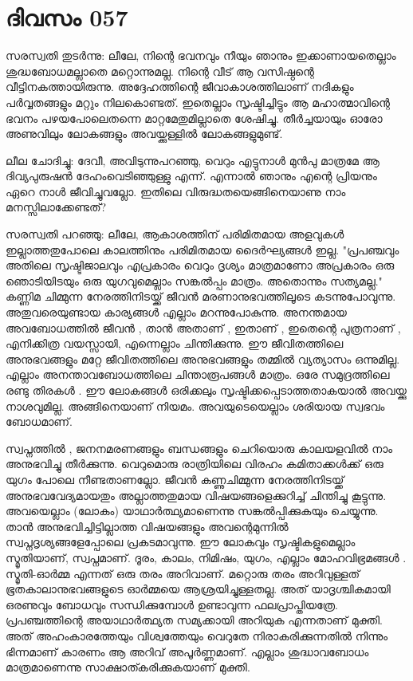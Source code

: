  
\section{ദിവസം 057}


സരസ്വതി തുടര്‍ന്നു: ലീലേ, നിന്റെ ഭവനവും നീയും ഞാനും ഇക്കാണായതെല്ലാം ശുദ്ധബോധമല്ലാതെ മറ്റൊന്നുമല്ല.  നിന്റെ വീട്‌ ആ വസിഷ്ഠന്റെ വീട്ടിനകത്തായിരുന്നു. അദ്ദേഹത്തിന്റെ ജീവാകാശത്തിലാണ്‌ നദികളും പര്‍വ്വതങ്ങളും മറ്റും നിലകൊണ്ടത്‌. ഇതെല്ലാം സൃഷ്ടിച്ചിട്ടും ആ മഹാത്മാവിന്റെ ഭവനം പഴയപോലെതന്നെ മാറ്റമേതുമില്ലാതെ ശേഷിച്ചു. തീര്‍ച്ചയായും ഓരോ അണുവിലും ലോകങ്ങളും അവയ്ക്കുള്ളില്‍ ലോകങ്ങളുമുണ്ട്‌.

ലീല ചോദിച്ചു: ദേവീ, അവിടുന്നുപറഞ്ഞു, വെറും എട്ടുനാള്‍ മുന്‍പു മാത്രമേ ആ ദിവ്യപുരുഷന്‍ ദേഹംവെടിഞ്ഞുള്ളു എന്ന്. എന്നാല്‍ ഞാനും എന്റെ പ്രിയനും ഏറെ നാള്‍ ജീവിച്ചുവല്ലോ. ഇതിലെ വിരുദ്ധതയെങ്ങിനെയാണു നാം മനസ്സിലാക്കേണ്ടത്‌?

സരസ്വതി പറഞ്ഞു: ലീലേ, ആകാശത്തിന്‌ പരിമിതമായ അളവുകള്‍ ഇല്ലാത്തതുപോലെ കാലത്തിനും പരിമിതമായ ദൈര്‍ഘ്യങ്ങള്‍ ഇല്ല. "പ്രപഞ്ചവും അതിലെ സൃഷ്ടിജാലവും എപ്രകാരം വെറും ദൃശ്യം മാത്രമാണോ അപ്രകാരം ഒരു ഞൊടിയിടയും ഒരു യുഗവുമെല്ലാം സങ്കല്‍പ്പം മാത്രം. അതൊന്നും സത്യമല്ല." കണ്ണിമ ചിമ്മുന്ന നേരത്തിനിടയ്ക്ക്‌ ജീവന്‍ മരണാനുഭവത്തിലൂടെ കടന്നുപോവുന്നു. അതുവരെയുണ്ടായ കാര്യങ്ങള്‍ എല്ലാം മറന്നുപോകുന്നു. അനന്തമായ അവബോധത്തില്‍ ജീവന്‍ , താന്‍ അതാണ്‌ , ഇതാണ്‌ , ഇതെന്റെ പുത്രനാണ്‌ , എനിക്കിത്ര വയസ്സായി, എന്നെല്ലാം ചിന്തിക്കുന്നു. ഈ ജീവിതത്തിലെ അനുഭവങ്ങളും മറ്റേ ജീവിതത്തിലെ അനുഭവങ്ങളും തമ്മില്‍ വ്യത്യാസം ഒന്നുമില്ല. എല്ലാം അനന്താവബോധത്തിലെ ചിന്താരൂപങ്ങള്‍ മാത്രം. ഒരേ സമുദ്രത്തിലെ രണ്ടു തിരകള്‍ . ഈ ലോകങ്ങള്‍ ഒരിക്കലും സൃഷ്ടിക്കപ്പെടാത്തതാകയാല്‍ അവയ്ക്കു നാശവുമില്ല. അങ്ങിനെയാണ്‌ നിയമം. അവയുടെയെല്ലാം ശരിയായ സ്വഭവം ബോധമാണ്‌.

സ്വപ്നത്തില്‍ ,  ജനനമരണങ്ങളും ബന്ധങ്ങളും ചെറിയൊരു കാലയളവില്‍ നാം അനുഭവിച്ചു തീര്‍ക്കുന്നു. വെറുമൊരു രാത്രിയിലെ വിരഹം കമിതാക്കള്‍ക്ക്‌ ഒരു യുഗം പോലെ നീണ്ടതാണല്ലോ. ജീവന്‍ കണ്ണുചിമ്മുന്ന നേരത്തിനിടയ്ക്ക്‌ അനുഭവവേദ്യമായതും അല്ലാത്തതുമായ വിഷയങ്ങളെക്കുറിച്ച്‌ ചിന്തിച്ചു കൂട്ടുന്നു. അവയെല്ലാം (ലോകം) യാഥാര്‍ത്ഥ്യമാണെന്നു സങ്കല്‍പ്പിക്കുകയും ചെയ്യുന്നു. താന്‍ അനുഭവിച്ചിട്ടില്ലാത്ത വിഷയങ്ങളും അവന്റെമുന്നില്‍ സ്വപ്നദൃശ്യങ്ങളേപ്പോലെ പ്രകടമാവുന്നു. ഈ ലോകവും സൃഷ്ടികളുമെല്ലാം സ്മൃതിയാണ്‌, സ്വപ്നമാണ്‌. ദൂരം, കാലം, നിമിഷം, യുഗം, എല്ലാം മോഹവിഭ്രമങ്ങള്‍ . സ്മൃതി-ഓര്‍മ്മ എന്നത്‌ ഒരു തരം അറിവാണ്‌. മറ്റൊരു തരം അറിവുള്ളത്‌ ഭൂതകാലാനുഭവങ്ങളുടെ ഓര്‍മ്മയെ ആശ്രയിച്ചുള്ളതല്ല. അത്‌ യാദൃശ്ചികമായി ഒരണുവും ബോധവും സന്ധിക്കുമ്പോള്‍ ഉണ്ടാവുന്ന ഫലപ്രാപ്തിയത്രേ. പ്രപഞ്ചത്തിന്റെ അയാഥാര്‍ത്ഥ്യത സമ്യക്കായി അറിയുക എന്നതാണ്‌ മുക്തി. അത്‌ അഹംകാരത്തേയും വിശ്വത്തേയും വെറുതേ നിരാകരിക്കുന്നതില്‍ നിന്നും ഭിന്നമാണ്‌ കാരണം ആ അറിവ്‌ അപൂര്‍ണ്ണമാണ്‌. എല്ലാം ശുദ്ധാവബോധം മാത്രമാണെന്നു സാക്ഷാത്കരിക്കുകയാണ്‌ മുക്തി.

